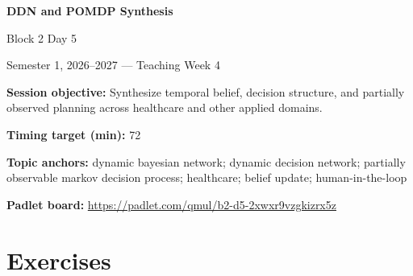 \documentclass[11pt]{article}
\begin{document}
\begin{center}\LARGE\bfseries DDN and POMDP Synthesis\end{center}

\begin{center}\large Block 2 Day 5\end{center}

\begin{center}Semester 1, 2026--2027 --- Teaching Week 4\end{center}

\begin{tcolorbox}[colback=MidnightBlue!4,colframe=MidnightBlue,title={Session Overview},fonttitle=\bfseries,breakable]
\textbf{Session objective:} Synthesize temporal belief, decision structure, and partially observed planning across healthcare and other applied domains.

\textbf{Timing target (min):} 72

\textbf{Topic anchors:} dynamic bayesian network; dynamic decision network; partially observable markov decision process; healthcare; belief update; human-in-the-loop

\textbf{Padlet board:} \url{https://padlet.com/qmul/b2-d5-2xwxr9vzgkizrx5z}
\end{tcolorbox}

\section*{Exercises}
\end{document}
